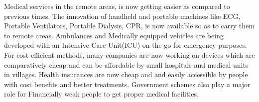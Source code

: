 \documentclass[12pt]{article}
\begin{document}
\raggedright{ Medical services in the remote areas, is now getting easier as compared to previous times. The innovation of handheld and portable machines like ECG, Portable Ventilators, Portable Dialysis, CPR, is now available so as to carry them to remote areas.
Ambulances and Medically equipped vehicles are being developed with an Intensive Care Unit(ICU) on-the-go for emergency purposes. For cost efficient methods, many companies are now working on devices which are comparatively cheap and can be affordable by small hospitals and medical units in villages. Health insurances are now cheap and and easily accessible by people with cost benefits and better treatments. Government schemes also play a major role for Financially weak people to get proper medical facilities.}
\end{document}
